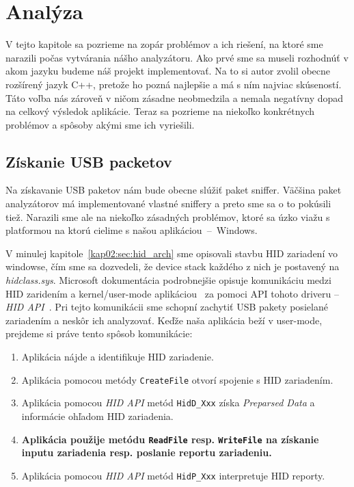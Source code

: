 \chapter{Analýza}
V tejto kapitole sa pozrieme na zopár problémov a ich riešení, na ktoré sme narazili počas vytvárania nášho analyzátoru.
Ako prvé sme sa museli rozhodnúť v akom jazyku budeme náš projekt implementovať. Na to si autor zvolil obecne rozšírený jazyk C++, pretože ho pozná najlepšie a má s ním najviac skúseností. Táto voľba nás zároveň v ničom zásadne neobmedzila a nemala negatívny dopad na celkový výsledok aplikácie. Teraz sa pozrieme na niekoľko konkrétnych problémov a spôsoby akými sme ich vyriešili.

\section{Získanie USB packetov}
Na získavanie USB paketov nám bude obecne slúžiť paket sniffer. Väčšina paket analyzátorov má implementované vlastné sniffery a preto sme sa o to pokúsili tiež. Narazili sme ale na niekoľko zásadných problémov, ktoré sa úzko viažu s platformou na ktorú cielime s našou aplikáciou~--~Windows.

V minulej kapitole~\ref{kap02:sec:hid_arch} sme opisovali stavbu HID zariadení vo windowse, čím sme sa dozvedeli, že device stack každého z nich je postavený na \textit{hidclass.sys}. Microsoft dokumentácia podrobnejšie opisuje komunikáciu medzi HID zaridením a kernel/user-mode aplikáciou~\cite{hid_opening_collections} za pomoci API tohoto driveru -- \textit{HID API}~\cite{hid_api}.
Pri tejto komunikácii sme schopní zachytiť USB pakety posielané zariadením a neskôr ich analyzovať. Keďže naša aplikácia beží v user-mode, prejdeme si práve tento spôsob komunikácie:
\begin{enumerate}
\item Aplikácia nájde a identifikuje HID zariadenie.
\item Aplikácia pomocou metódy \texttt{CreateFile} otvorí spojenie s HID zariadením.
\item Aplikácia pomocou \textit{HID API} metód \texttt{HidD\_Xxx} získa \textit{Preparsed Data} a informácie ohľadom HID zariadenia.
\item \label{kap03:read:paket} \textbf{Aplikácia použije metódu \texttt{ReadFile} resp. \texttt{WriteFile} na získanie inputu zariadenia resp. poslanie reportu zariadeniu.}
\item Aplikácia pomocou \textit{HID API} metód \texttt{HidP\_Xxx} interpretuje HID reporty.
\end{enumerate}


